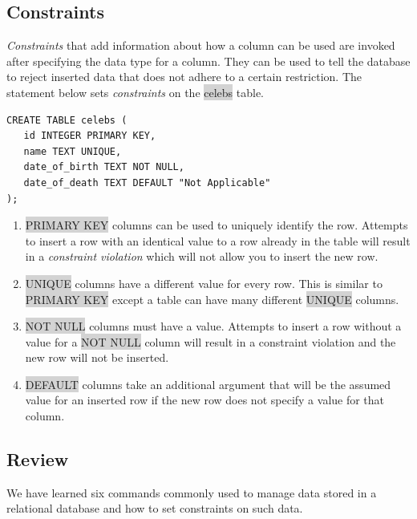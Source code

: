 \documentclass[11pt]{article}
\begin{document}
\subsection{Constraints}
\textit{Constraints} that add information about how a column can be used are invoked after specifying the data type for a column. They can be used to tell the database to reject inserted data that does not adhere to a certain restriction. The statement below sets \textit{constraints} on the \colorbox{lightgray}{celebs} table.
\begin{lstlisting}
CREATE TABLE celebs (
   id INTEGER PRIMARY KEY, 
   name TEXT UNIQUE,
   date_of_birth TEXT NOT NULL,
   date_of_death TEXT DEFAULT "Not Applicable"
);
\end{lstlisting}
\begin{enumerate}[leftmargin = *]
\item \colorbox{lightgray}{PRIMARY KEY} columns can be used to uniquely identify the row. Attempts to insert a row with an identical value to a row already in the table will result in a \textit{constraint violation} which will not allow you to insert the new row.
\item \colorbox{lightgray}{UNIQUE} columns have a different value for every row. This is similar to \colorbox{lightgray}{PRIMARY KEY} except a table can have many different \colorbox{lightgray}{UNIQUE} columns.
\item \colorbox{lightgray}{NOT NULL} columns must have a value. Attempts to insert a row without a value for a \colorbox{lightgray}{NOT NULL} column will result in a constraint violation and the new row will not be inserted.
\item \colorbox{lightgray}{DEFAULT} columns take an additional argument that will be the assumed value for an inserted row if the new row does not specify a value for that column.
\end{enumerate}

\subsection{Review}
We have learned six commands commonly used to manage data stored in a relational database and how to set constraints on such data. 
\end{document}
